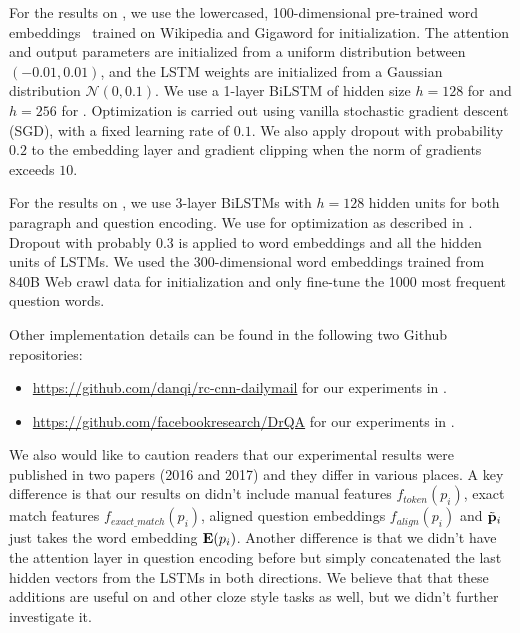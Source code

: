 For the results on , we use the lowercased, 100-dimensional pre-trained  word embeddings~\cite{pennington2014glove} trained on Wikipedia and Gigaword for initialization. The attention and output parameters are initialized from a uniform distribution between $(-0.01, 0.01)$, and the LSTM weights are initialized from a Gaussian distribution $\mathcal{N}(0, 0.1)$. We use a 1-layer BiLSTM of hidden size $h = 128$ for  and $h = 256$ for . Optimization is carried out using vanilla stochastic gradient descent (SGD), with a fixed learning rate of $0.1$.  We also apply dropout with probability $0.2$ to the embedding layer and gradient clipping when the norm of gradients exceeds $10$.

For the results on , we use 3-layer BiLSTMs with $h = 128$ hidden units for both paragraph and question encoding. We use  for optimization as described in \cite{kingma2014adam}. Dropout with probably $0.3$ is applied to word embeddings and all the hidden units of LSTMs. We used the $300$-dimensional  word embeddings trained from 840B Web crawl data for initialization and only fine-tune the 1000 most frequent question words.

Other implementation details can be found in the following two Github repositories:
\begin{itemize}
    \item
        \href{https://github.com/danqi/rc-cnn-dailymail}{https://github.com/danqi/rc-cnn-dailymail} for our experiments in .
    \item
        \href{https://github.com/facebookresearch/DrQA}{https://github.com/facebookresearch/DrQA} for our experiments in .
\end{itemize}

We also would like to caution readers that our experimental results were published in two papers (2016 and 2017) and they differ in various places. A key difference is that our results on  didn't include manual features $f_{token}(p_i)$, exact match features $f_{exact\_match}(p_i)$, aligned question embeddings $f_{align}(p_i)$ and $\tilde{\mathbf{p}}_i$ just takes the word embedding $\mathbf{E}(p_i)$. Another difference is that we didn't have the attention layer in question encoding before but simply concatenated the last hidden vectors from the LSTMs in both directions. We believe that that these additions are useful on  and other cloze style tasks as well, but we didn't further investigate it.


